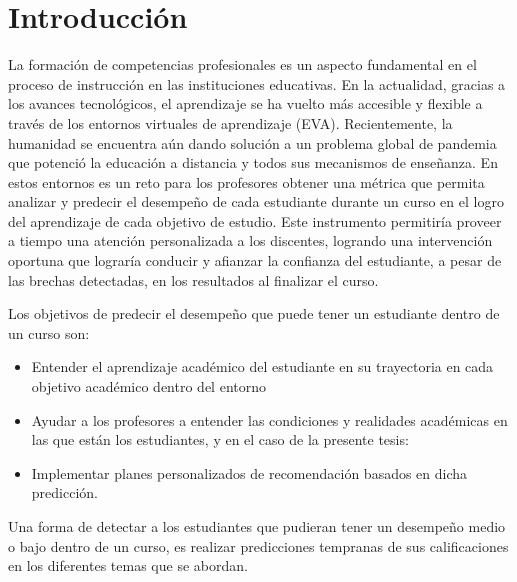 \chapter*{Introducción}\label{chapter:introduction}
La formación de competencias profesionales es un aspecto fundamental en el proceso de instrucción en las instituciones educativas. En la actualidad, gracias a los avances tecnológicos, el aprendizaje se ha vuelto más accesible y flexible a través de los entornos virtuales de aprendizaje (EVA). Recientemente, la humanidad se encuentra aún dando solución a un problema global de pandemia que potenció la educación a distancia y todos sus mecanismos de enseñanza. En estos entornos es un reto para los profesores obtener una métrica que permita analizar y predecir el desempeño de cada estudiante durante un curso en el logro del aprendizaje de cada objetivo de estudio. Este instrumento permitiría proveer a tiempo una atención personalizada a los discentes, logrando una intervención oportuna que lograría conducir y afianzar la confianza del estudiante, a pesar de las brechas detectadas, en los resultados al finalizar el curso.

Los objetivos de predecir el desempeño que puede tener un estudiante dentro de un curso son:
\begin{itemize}
    \item Entender el aprendizaje académico del estudiante en su trayectoria en cada objetivo académico dentro del entorno
    \item Ayudar a los profesores a entender las condiciones y realidades académicas en las que están los estudiantes, y en el caso de la presente tesis:
    \item Implementar planes personalizados de recomendación basados en dicha predicción.
\end{itemize}

Una forma de detectar a los estudiantes que pudieran tener un desempeño medio o bajo dentro de un curso, es realizar predicciones tempranas de sus calificaciones en los diferentes temas que se abordan.

